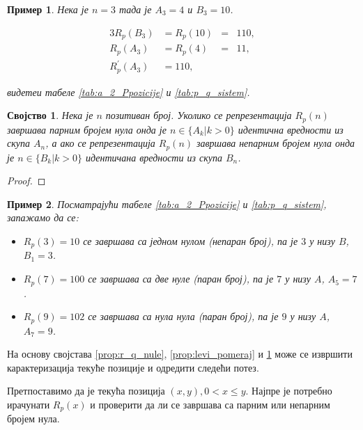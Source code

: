 \documentclass[a4paper]{article}
\newtheorem{example}{Пример}
\newtheorem{property}{Својство}
\begin{document}
\begin{example}
	Нека је $ n = 3 $ тада је $ A_{3} = 4 $ и $ B_{3} = 10 $.
	
	\begin{alignat*}{3}
		R_{p}(B_{3}) &= R_{p}(10)	&=& 110,\\
		R_{p}(A_{3}) &= R_{p}(4)	&=& 11,\\
		R_{p}^{'}(A_{3}) &= 110,
	\end{alignat*}
	
	видетеи табеле \ref{tab:a_2_Ppozicije} и \ref{tab:p_q_sistem}.
\end{example}

\begin{property}
	\label{prop:r_p_nule}
	Нека је $ n $ позитиван број. Уколико се репрезентација $ R_p(n) $ завршава парним бројем нула онда је $ n \in \{A_{k} | k>0\} $ идентична вредности из скупа $ A_{n} $, а ако се репрезентација $ R_p(n) $ завршава непарним бројем нула онда је $ n \in \{B_{k} | k>0\} $ идентичана вредности из скупа $ B_{n} $.
\end{property}

\begin{proof}
	 
\end{proof}

\begin{example}
	Посматрајући табеле \ref{tab:a_2_Ppozicije} и \ref{tab:p_q_sistem}, запажамо да се:
	\begin{itemize}
		\item $ R_{p}(3) = 10 $ се завршава са једном нулом (непаран број), па је $ 3 $ у низу $ B $, $ B_{1} = 3 $. 
		\item $ R_{p}(7) = 100 $ се завршава са две нуле (паран број), па је $ 7 $ у низу $ A $, $ A_{5} = 7 $.
		\item $ R_{p}(9) = 102 $ се завршава са нула нула (паран број), па је $ 9 $ у низу $ A $, $ A_{7} = 9 $.
	\end{itemize}
\end{example}

На основу својстава \ref{prop:r_q_nule}, \ref{prop:levi_pomeraj} и \ref{prop:r_p_nule} може се извршити карактеризација текуће позиције и одредити следећи потез.

Претпоставимо да је текућа позиција $ (x, y), 0 < x \le y $. Најпре је потребно ирачунати $ R_{p}(x) $ и проверити да ли се завршава са парним или непарним бројем нула.
\end{document}
